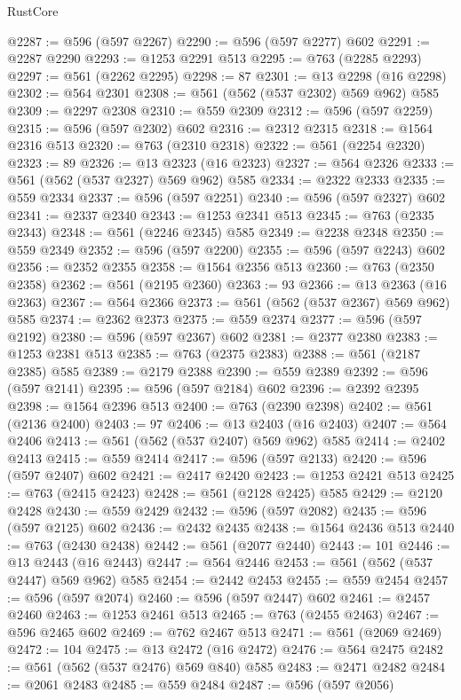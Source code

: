 \begin{lexlean}{RustCore}
\begin{coremodule}
@2287 := @596 (@597 @2267)
@2290 := @596 (@597 @2277) @602
@2291 := @2287 @2290
@2293 := @1253 @2291 @513
@2295 := @763 (@2285 @2293)
@2297 := @561 (@2262 @2295)
@2298 := 87
@2301 := @13 @2298 (@16 @2298)
@2302 := @564 @2301
@2308 := @561 (@562 (@537 @2302) @569 @962) @585
@2309 := @2297 @2308
@2310 := @559 @2309
@2312 := @596 (@597 @2259)
@2315 := @596 (@597 @2302) @602
@2316 := @2312 @2315
@2318 := @1564 @2316 @513
@2320 := @763 (@2310 @2318)
@2322 := @561 (@2254 @2320)
@2323 := 89
@2326 := @13 @2323 (@16 @2323)
@2327 := @564 @2326
@2333 := @561 (@562 (@537 @2327) @569 @962) @585
@2334 := @2322 @2333
@2335 := @559 @2334
@2337 := @596 (@597 @2251)
@2340 := @596 (@597 @2327) @602
@2341 := @2337 @2340
@2343 := @1253 @2341 @513
@2345 := @763 (@2335 @2343)
@2348 := @561 (@2246 @2345) @585
@2349 := @2238 @2348
@2350 := @559 @2349
@2352 := @596 (@597 @2200)
@2355 := @596 (@597 @2243) @602
@2356 := @2352 @2355
@2358 := @1564 @2356 @513
@2360 := @763 (@2350 @2358)
@2362 := @561 (@2195 @2360)
@2363 := 93
@2366 := @13 @2363 (@16 @2363)
@2367 := @564 @2366
@2373 := @561 (@562 (@537 @2367) @569 @962) @585
@2374 := @2362 @2373
@2375 := @559 @2374
@2377 := @596 (@597 @2192)
@2380 := @596 (@597 @2367) @602
@2381 := @2377 @2380
@2383 := @1253 @2381 @513
@2385 := @763 (@2375 @2383)
@2388 := @561 (@2187 @2385) @585
@2389 := @2179 @2388
@2390 := @559 @2389
@2392 := @596 (@597 @2141)
@2395 := @596 (@597 @2184) @602
@2396 := @2392 @2395
@2398 := @1564 @2396 @513
@2400 := @763 (@2390 @2398)
@2402 := @561 (@2136 @2400)
@2403 := 97
@2406 := @13 @2403 (@16 @2403)
@2407 := @564 @2406
@2413 := @561 (@562 (@537 @2407) @569 @962) @585
@2414 := @2402 @2413
@2415 := @559 @2414
@2417 := @596 (@597 @2133)
@2420 := @596 (@597 @2407) @602
@2421 := @2417 @2420
@2423 := @1253 @2421 @513
@2425 := @763 (@2415 @2423)
@2428 := @561 (@2128 @2425) @585
@2429 := @2120 @2428
@2430 := @559 @2429
@2432 := @596 (@597 @2082)
@2435 := @596 (@597 @2125) @602
@2436 := @2432 @2435
@2438 := @1564 @2436 @513
@2440 := @763 (@2430 @2438)
@2442 := @561 (@2077 @2440)
@2443 := 101
@2446 := @13 @2443 (@16 @2443)
@2447 := @564 @2446
@2453 := @561 (@562 (@537 @2447) @569 @962) @585
@2454 := @2442 @2453
@2455 := @559 @2454
@2457 := @596 (@597 @2074)
@2460 := @596 (@597 @2447) @602
@2461 := @2457 @2460
@2463 := @1253 @2461 @513
@2465 := @763 (@2455 @2463)
@2467 := @596 @2465 @602
@2469 := @762 @2467 @513
@2471 := @561 (@2069 @2469)
@2472 := 104
@2475 := @13 @2472 (@16 @2472)
@2476 := @564 @2475
@2482 := @561 (@562 (@537 @2476) @569 @840) @585
@2483 := @2471 @2482
@2484 := @2061 @2483
@2485 := @559 @2484
@2487 := @596 (@597 @2056)

\end{coremodule}
\end{lexlean}
